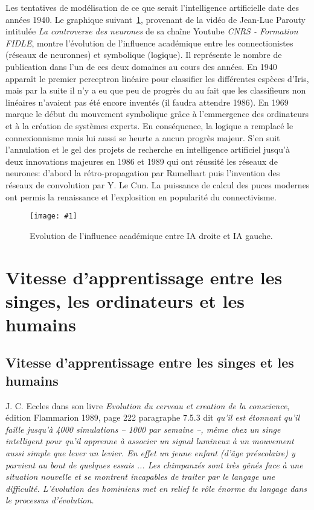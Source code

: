 \documentclass[french, a4paper, 10pt]{article}
\newcommand{\dessin}[4]{
\begin{figure}[htb]
\centering
\texttt{[image: \#1]}
\caption{#3}
\label{#4}
\end{figure}}
\begin{document}
Les tentatives de modélisation de ce que serait l'intelligence artificielle date
des années 1940.  Le graphique suivant~\ref{ConnectionistSymbolic}, provenant de
la vidéo de Jean-Luc Parouty intitulée \emph{La controverse des neurones} de sa
chaîne Youtube \emph{CNRS - Formation FIDLE}, montre l'évolution de l'influence
académique entre les connectionistes (réseaux de neuronnes) et symbolique
(logique). Il représente le nombre de publication dans l'un de ces deux domaines
au cours des années. En 1940 apparaît le premier perceptron linéaire pour
classifier les différentes espèces d'Iris, mais par la suite il n'y a eu que peu
de progrès du au fait que les classifieurs non linéaires n'avaient pas été
encore inventés (il faudra attendre 1986). En 1969 marque le début du mouvement
symbolique grâce à l'emmergence des ordinateurs et à la création de systèmes
experts. En conséquence, la logique a remplacé le connexionnisme mais lui aussi
se heurte a aucun progrès majeur. S'en suit l'annulation et le gel des projets
de recherche en intelligence artificiel jusqu'à deux innovations majeures en
1986 et 1989 qui ont réussité les réseaux de neurones: d'abord la
rétro-propagation par Rumelhart puis l'invention des réseaux de convolution par
Y. Le Cun. La puissance de calcul des puces modernes ont permis la renaissance
et l'explosition en popularité du connectivisme.

\dessin{pics/ConnectionistSymbolic}{0.40}{Evolution de
l'influence académique entre IA droite et IA gauche.}{ConnectionistSymbolic}

\section{Vitesse d'apprentissage entre les singes, les ordinateurs et les humains}

\subsection{Vitesse d'apprentissage entre les singes et les humains}

J. C. Eccles dans son livre \emph{Evolution du cerveau et creation de la
conscience}, édition Flammarion 1989, page 222 paragraphe 7.5.3 dit \emph{qu'il
est étonnant qu'il faille jusqu'à 4000 simulations -- 1000 par semaine --, même
chez un singe intelligent pour qu'il apprenne à associer un signal lumineux à un
mouvement aussi simple que lever un levier. En effet un jeune enfant (d'âge
préscolaire) y parvient au bout de quelques essais ... Les chimpanzés sont très
gênés face à une situation nouvelle et se montrent incapables de traiter par le
langage une difficulté. L'évolution des hominiens met en relief le rôle énorme
du langage dans le processus d'évolution. }
\end{document}
